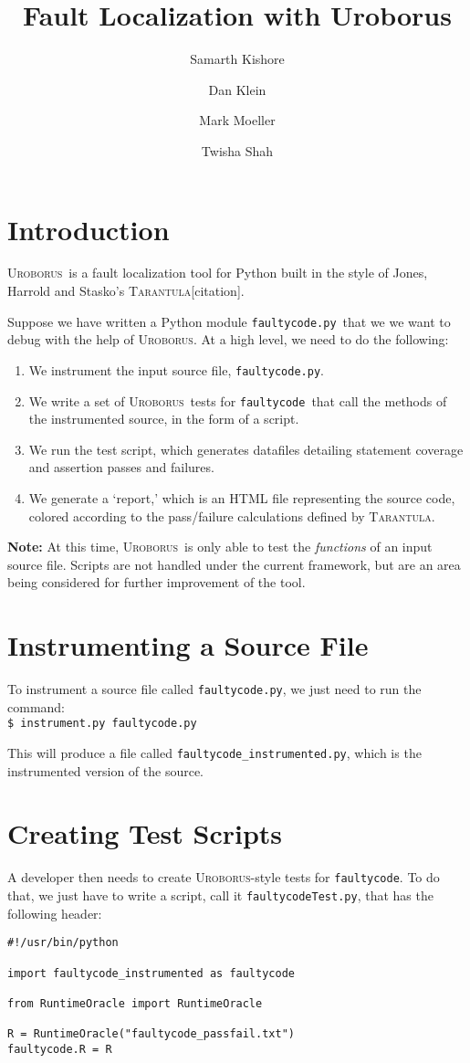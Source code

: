 \documentclass[english]{article}
\title{Fault Localization with Uroborus}
\author{Samarth Kishore
\and 
Dan Klein
\and 
Mark Moeller
\and 
Twisha Shah
}
\newcommand{\Uro}{\textsc{Uroborus}}
\newcommand{\Taran}{\textsc{Tarantula}}
\newcommand{\fc}{\texttt{faultycode}}
\newcommand{\fcp}{\texttt{faultycode.py}}
\newcommand{\fcT}{\texttt{faultycodeTest.py}}
\newcommand{\fcip}{\texttt{faultycode_instrumented.py}}
\begin{document}
\maketitle


\section{Introduction}

\Uro\ is a fault localization tool for Python built in the style of Jones, Harrold and Stasko's
\Taran [citation]. 

Suppose we have written a Python module \fcp\ that we we want to debug with the
help of \Uro. At a high level, we need to do the following:
\begin{enumerate}
\item We instrument the input source file, \fcp.
\item We write a set of \Uro\ tests for \fc\ that call the methods of the instrumented source, in the
form of a script.
\item We run the test script, which generates datafiles detailing statement coverage and assertion
passes and failures.
\item We generate a `report,' which is an HTML file representing the source code, colored according
to the pass/failure calculations defined by \Taran.
\end{enumerate}
\textbf{Note:} At this time, \Uro\ is only able to test the \emph{functions} of an
input source file. Scripts are not handled under the current framework, but are an area being
considered for further improvement of the tool.

\section{Instrumenting a Source File}

To instrument a source file called \fcp, we just need to run the command:\\
\texttt{\$ instrument.py }\fcp

This will produce a file called \fcip, which is the instrumented version of the source.

\section{Creating Test Scripts}

A developer then needs to create \Uro-style tests for \fc. To do that, we just have to write a
script, call it \fcT, that has the following header:\\
\begin{verbatim}
#!/usr/bin/python

import faultycode_instrumented as faultycode

from RuntimeOracle import RuntimeOracle

R = RuntimeOracle("faultycode_passfail.txt")
faultycode.R = R
\end{verbatim}
\end{document}

